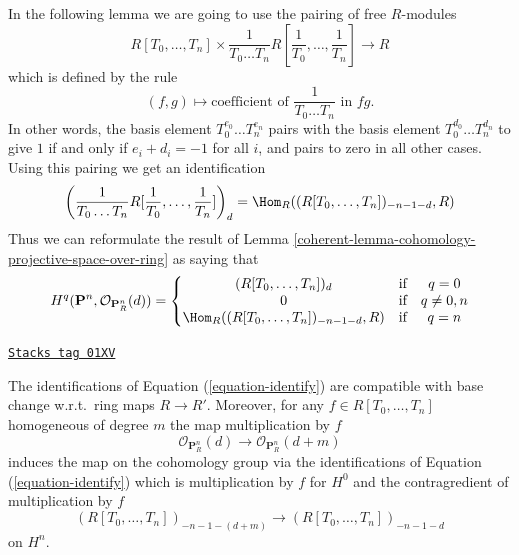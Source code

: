 In the following lemma we are going to use the pairing of free
$R$-modules
$$
R[T_0, \ldots, T_n]
\times
\frac{1}{T_0 \ldots T_n} R[\frac{1}{T_0}, \ldots, \frac{1}{T_n}]
\longrightarrow
R
$$
which is defined by the rule
$$
(f, g)
\longmapsto
\text{coefficient of }
\frac{1}{T_0 \ldots T_n}
\text{ in }fg.
$$
In other words, the basis element $T_0^{e_0} \ldots T_n^{e_n}$ pairs
with the basis element $T_0^{d_0} \ldots T_n^{d_n}$ to give $1$ if and only
if $e_i + d_i = -1$ for all $i$, and pairs to zero in all other cases.
Using this pairing we get an identification
$$
\left(\frac{1}{T_0 \ldots T_n} R[\frac{1}{T_0}, \ldots, \frac{1}{T_n}]\right)_d
=
\Hom_R((R[T_0, \ldots, T_n])_{-n - 1 - d}, R)
$$
Thus we can reformulate the result of
Lemma \ref{coherent-lemma-cohomology-projective-space-over-ring} as saying that
\begin{equation}
\label{equation-identify}
H^q(\mathbf{P}^n, \mathcal{O}_{\mathbf{P}^n_R}(d)) =
\left\{
\begin{matrix}
(R[T_0, \ldots, T_n])_d & \text{if} & q = 0 \\
0 & \text{if} & q \not = 0, n \\
\Hom_R((R[T_0, \ldots, T_n])_{-n - 1 - d}, R)
& \text{if} & q = n
\end{matrix}
\right.
\end{equation}

\begin{lemma}
\label{coherent-lemma-identify-functorially}
\href{https://stacks.math.columbia.edu/tag/01XV}{\texttt{Stacks tag 01XV}}

The identifications of Equation (\ref{equation-identify}) are
compatible with base change w.r.t.\ ring maps $R \to R'$.
Moreover, for any $f \in R[T_0, \ldots, T_n]$ homogeneous
of degree $m$ the map multiplication by $f$
$$
\mathcal{O}_{\mathbf{P}^n_R}(d)
\longrightarrow
\mathcal{O}_{\mathbf{P}^n_R}(d + m)
$$
induces the map on the cohomology group via the identifications
of Equation (\ref{equation-identify}) which is multiplication by
$f$ for $H^0$ and the contragredient of multiplication by $f$
$$
(R[T_0, \ldots, T_n])_{-n - 1 - (d + m)}
\longrightarrow
(R[T_0, \ldots, T_n])_{-n - 1 - d}
$$
on $H^n$.
\end{lemma}

